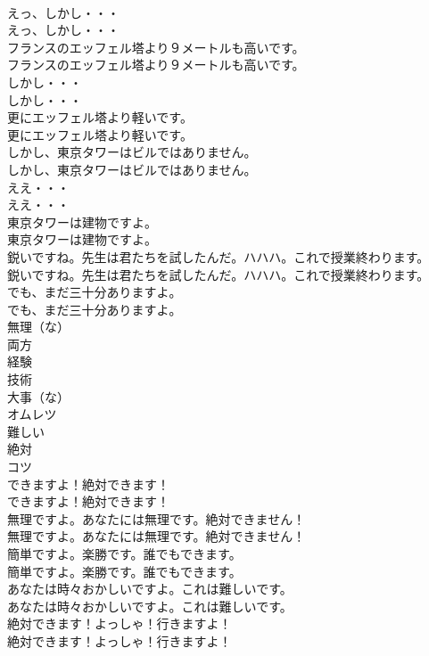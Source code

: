 \documentclass[8pt]{extreport}
\begin{document}
\begin{CJK}{UTF8}{min}
\\	えっ、しかし・・・	
\\	えっ、しかし・・・ 
\\	フランスのエッフェル塔より９メートルも高いです。	
\\	フランスのエッフェル塔より９メートルも高いです。 
\\	しかし・・・	
\\	しかし・・・ 
\\	更にエッフェル塔より軽いです。	
\\	更にエッフェル塔より軽いです。 
\\	しかし、東京タワーはビルではありません。	
\\	しかし、東京タワーはビルではありません。 
\\	ええ・・・	
\\	ええ・・・ 
\\	東京タワーは建物ですよ。	
\\	東京タワーは建物ですよ。 
\\	鋭いですね。先生は君たちを試したんだ。ハハハ。これで授業終わります。	
\\	鋭いですね。先生は君たちを試したんだ。ハハハ。これで授業終わります。 
\\	でも、まだ三十分ありますよ。	
\\	でも、まだ三十分ありますよ。 
\\	無理（な）
\\	両方
\\	経験
\\	技術
\\	大事（な）
\\	オムレツ
\\	難しい
\\	絶対
\\	コツ
\\	できますよ！絶対できます！	
\\	できますよ！絶対できます！ 
\\	無理ですよ。あなたには無理です。絶対できません！	
\\	無理ですよ。あなたには無理です。絶対できません！ 
\\	簡単ですよ。楽勝です。誰でもできます。	
\\	簡単ですよ。楽勝です。誰でもできます。 
\\	あなたは時々おかしいですよ。これは難しいです。	
\\	あなたは時々おかしいですよ。これは難しいです。 
\\	絶対できます！よっしゃ！行きますよ！	
\\	絶対できます！よっしゃ！行きますよ！ 

\end{CJK}
\end{document}
